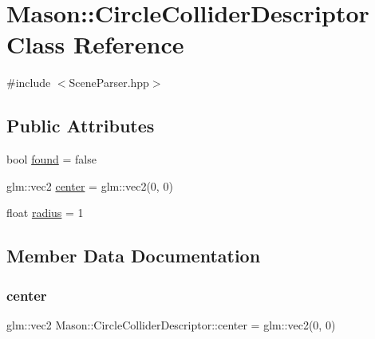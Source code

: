 \hypertarget{class_mason_1_1_circle_collider_descriptor}{}\section{Mason\+:\+:Circle\+Collider\+Descriptor Class Reference}
\label{class_mason_1_1_circle_collider_descriptor}


{\ttfamily \#include $<$Scene\+Parser.\+hpp$>$}

\subsection*{Public Attributes}
\begin{DoxyCompactItemize}
\item 
bool \hyperlink{class_mason_1_1_circle_collider_descriptor_af6bbcde718abdf4fca1fd33283d90fe7}{found} = false
\item 
glm\+::vec2 \hyperlink{class_mason_1_1_circle_collider_descriptor_a95cb9b34dd352a4fb9d13b883bebc4b6}{center} = glm\+::vec2(0, 0)
\item 
float \hyperlink{class_mason_1_1_circle_collider_descriptor_a8785a58429df1c9bac9f1f482164e9f1}{radius} = 1
\end{DoxyCompactItemize}


\subsection{Member Data Documentation}
\hypertarget{class_mason_1_1_circle_collider_descriptor_a95cb9b34dd352a4fb9d13b883bebc4b6}{}\label{class_mason_1_1_circle_collider_descriptor_a95cb9b34dd352a4fb9d13b883bebc4b6} 
\subsubsection{\texorpdfstring{center}{center}}
{\footnotesize\ttfamily glm\+::vec2 Mason\+::\+Circle\+Collider\+Descriptor\+::center = glm\+::vec2(0, 0)}

\hypertarget{class_mason_1_1_circle_collider_descriptor_af6bbcde718abdf4fca1fd33283d90fe7}{}\label{class_mason_1_1_circle_collider_descriptor_af6bbcde718abdf4fca1fd33283d90fe7} 
